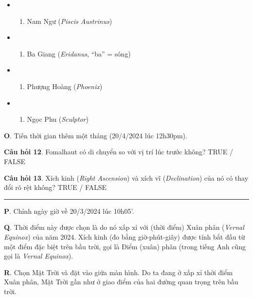 \documentclass[
  a4paper,
]{book}
\providecommand{\tightlist}{%
  \setlength{\itemsep}{0pt}\setlength{\parskip}{0pt}}
\begin{document}
\begin{itemize}
\tightlist
\item
  \begin{enumerate}
  \def\labelenumi{(\Alph{enumi})}
  \tightlist
  \item
    Nam Ngư (\emph{Piscis Austrinus})\\
  \end{enumerate}
\item
  \begin{enumerate}
  \def\labelenumi{(\Alph{enumi})}
  \setcounter{enumi}{1}
  \tightlist
  \item
    Ba Giang (\emph{Eridanus}, ``ba'' = sóng)\\
  \end{enumerate}
\item
  \begin{enumerate}
  \def\labelenumi{(\Alph{enumi})}
  \setcounter{enumi}{2}
  \tightlist
  \item
    Phượng Hoàng (\emph{Phoenix})\\
  \end{enumerate}
\item
  \begin{enumerate}
  \def\labelenumi{(\Alph{enumi})}
  \setcounter{enumi}{3}
  \tightlist
  \item
    Ngọc Phu (\emph{Sculptor})
  \end{enumerate}
\end{itemize}

\textbf{O}. Tiến thời gian thêm một tháng (20/4/2024 lúc 12h30pm).

\textbf{Câu hỏi 12}. Fomalhaut có di chuyển so với vị trí lúc trước không?
TRUE / FALSE

\textbf{Câu hỏi 13}. Xích kinh (\emph{Right Ascension}) và xích vĩ (\emph{Declination}) của nó có thay đổi rõ rệt không?
TRUE / FALSE

\begin{center}\rule{0.5\linewidth}{0.5pt}\end{center}

\textbf{P}. Chỉnh ngày giờ về 20/3/2024 lúc 10h05'.

\textbf{Q}. Thời điểm này được chọn là do nó xấp xỉ với (thời điểm) Xuân phân (\emph{Vernal Equinox}) của năm 2024. Xích kinh (đo bằng giờ-phút-giây) được tính bắt đầu từ một điểm đặc biệt trên bầu trời, gọi là Điểm (xuân) phân (trong tiếng Anh cũng gọi là \emph{Vernal Equinox}).

\textbf{R}. Chọn Mặt Trời và đặt vào giữa màn hình. Do ta đang ở xấp xỉ thời điểm Xuân phân, Mặt Trời gần như ở giao điểm của hai đường quan trọng trên bầu trời.
\end{document}
